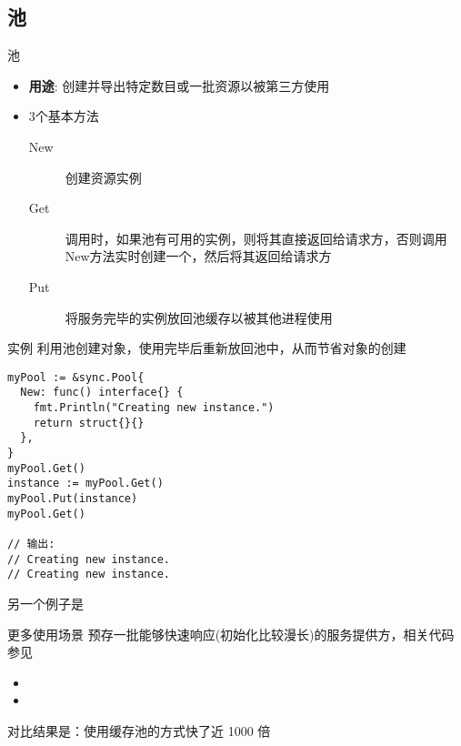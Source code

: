 \subsection{池\Pool }
\begin{frame}{池\Pool }
    \begin{itemize}
        \item \textbf{用途}: \Pool 创建并导出特定数目或一批资源以被第三方使用
        \item 3个基本方法
            \begin{description}
                \item[New] 创建资源实例
                \item[Get] 调用时，如果池有可用的实例，则将其直接返回给请求方，否则调用New方法实时创建一个，然后将其返回给请求方
                \item[Put] 将服务完毕的实例放回池缓存以被其他进程使用
            \end{description}
    \end{itemize}
\end{frame}

\begin{frame}[fragile]{实例}
    利用池创建对象，\alert{使用完毕后重新放回池中}，从而节省对象的创建
\begin{lstlisting}
myPool := &sync.Pool{
  New: func() interface{} {
    fmt.Println("Creating new instance.")
    return struct{}{}
  },
}
myPool.Get()
instance := myPool.Get()
myPool.Put(instance)
myPool.Get()

// 输出:
// Creating new instance.
// Creating new instance.
\end{lstlisting}

另一个例子是

\end{frame}

\begin{frame}{更多使用场景}
    预存一批能够快速响应(初始化比较漫长)的服务提供方，相关代码参见
    \begin{itemize}
        \item {}
        \item {}
    \end{itemize}

    \bigskip
    对比结果是：使用缓存池的方式快了近 1000 倍
\end{frame}

